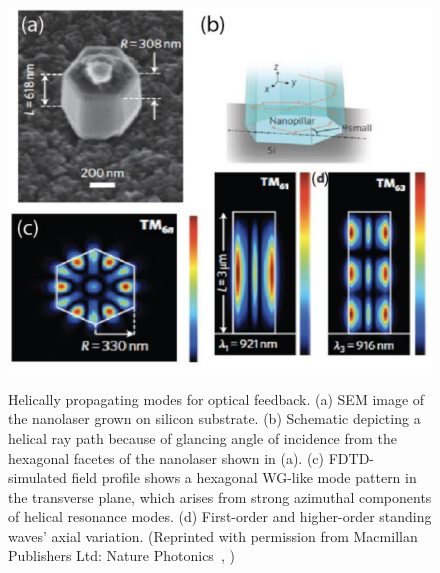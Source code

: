 \begin{figure}
  \caption{Helically propagating modes for optical feedback. (a) SEM image of the nanolaser grown on silicon substrate. (b) Schematic depicting a helical ray path because of glancing angle of incidence from the hexagonal facetes of the nanolaser shown in (a). (c) FDTD-simulated field profile shows a hexagonal WG-like mode pattern in the transverse plane, which arises from strong azimuthal components of helical resonance modes. (d) First-order and higher-order standing waves' axial variation. (Reprinted with permission from Macmillan Publishers Ltd: Nature Photonics~\cite{Chen:2011cg}, )}
  \centering
  \includegraphics[width=\textwidth]{pictures/LM/HelicalMode}
  \label{HelicalMode}
\end{figure}

